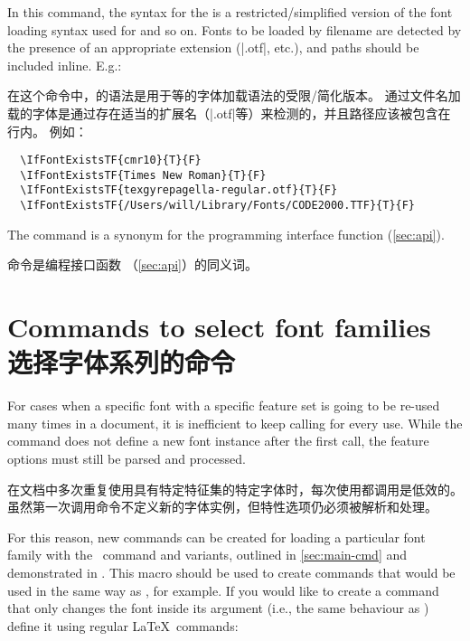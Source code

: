 \documentclass[a4paper]{l3doc}
\begin{document}
In this command, the syntax for the  is a restricted/simplified version of the font loading syntax used for  and so on.
Fonts to be loaded by filename are detected by the presence of an appropriate extension (|.otf|, etc.), and paths should be included inline.
E.g.:

在这个命令中，的语法是用于等的字体加载语法的受限/简化版本。
通过文件名加载的字体是通过存在适当的扩展名（|.otf|等）来检测的，并且路径应该被包含在行内。
例如：


\begin{Verbatim}
  \IfFontExistsTF{cmr10}{T}{F}
  \IfFontExistsTF{Times New Roman}{T}{F}
  \IfFontExistsTF{texgyrepagella-regular.otf}{T}{F}
  \IfFontExistsTF{/Users/will/Library/Fonts/CODE2000.TTF}{T}{F}
\end{Verbatim}

The  command is a synonym for the programming interface function  (\vref{sec:api}).


 命令是编程接口函数 （\vref{sec:api}）的同义词。


\section{Commands to select font families\\选择字体系列的命令}

For cases when a specific font with a specific
feature set is going to be re-used many times in a document, it is inefficient
to keep calling  for every use. While the  command does not define
a new font instance after the first call, the feature options must still be
parsed and processed.

在文档中多次重复使用具有特定特征集的特定字体时，每次使用都调用是低效的。
虽然第一次调用命令不定义新的字体实例，但特性选项仍必须被解析和处理。

For this reason, new commands can be created for loading a particular font
family with the \cmd\newfontfamily\ command and variants,
outlined in \vref{sec:main-cmd} and demonstrated in .
This macro should be used to create commands that would be used in
the same way as \cmd\rmfamily, for example.
If you would like to create a command that only changes the font
inside its argument (i.e., the same behaviour as ) define it using regular \LaTeX\
commands:
\end{document}
